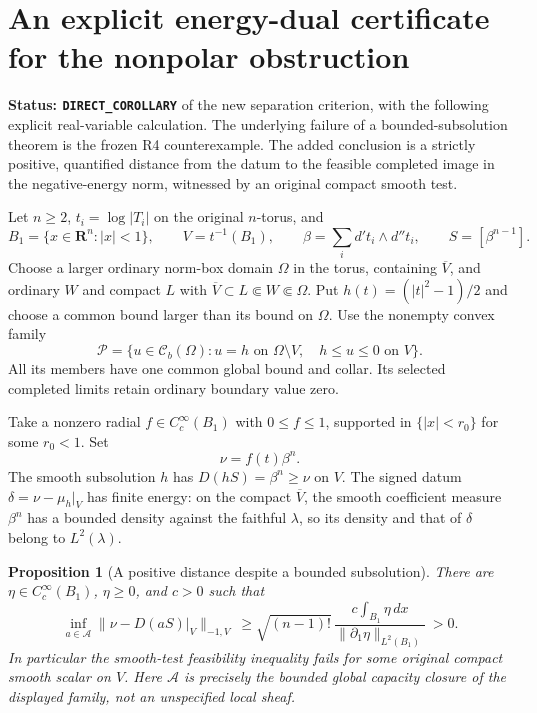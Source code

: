 \documentclass[11pt,a4paper]{article}
\numberwithin{equation}{section}
\newtheorem{proposition}[theorem]{Proposition}
\theoremstyle{definition}
\theoremstyle{remark}
\begin{document}


\section{An explicit energy-dual certificate for the nonpolar obstruction}
\label{sec:r6-toric-energy-certificate}

\noindent\textbf{Status: \texttt{DIRECT\_COROLLARY}} of the new
separation criterion, with the following explicit real-variable
calculation. The underlying failure of a bounded-subsolution theorem is
the frozen R4 counterexample. The added conclusion is a strictly positive,
quantified distance from the datum to the feasible completed image in the
negative-energy norm, witnessed by an original compact smooth test.

Let $n\ge2$, $t_i=\log|T_i|$ on the original $n$-torus, and
\[
 B_1=\{x\in\mathbf R^n:|x|<1\},\qquad V=t^{-1}(B_1),\qquad
 \beta=\sum_i d't_i\wedge d''t_i,\qquad S=[\beta^{n-1}].
\]
Choose a larger ordinary norm-box domain $\Omega$ in the torus,
containing $\overline V$, and ordinary $W$ and compact $L$ with
$\overline V\subset L\Subset W\Subset\Omega$.
Put $h(t)=(|t|^2-1)/2$ and choose a common bound larger than its bound
on $\Omega$. Use the nonempty convex family
\[
 \mathscr P=\{u\in\mathcal C_b(\Omega):
       u=h\text{ on }\Omega\setminus V,\quad h\le u\le0\text{ on }V\}.
\]
All its members have one common global bound and collar. Its selected
completed limits retain ordinary boundary value zero.

Take a nonzero radial $f\in C_c^\infty(B_1)$ with $0\le f\le1$,
supported in $\{|x|<r_0\}$ for some $r_0<1$. Set
\[
                     \nu=f(t)\beta^n.
\]
The smooth subsolution $h$ has $D(hS)=\beta^n\ge\nu$ on $V$.
The signed datum $\delta=\nu-\mu_h|_V$ has finite energy: on the
compact $\overline V$, the smooth coefficient measure $\beta^n$ has a
bounded density against the faithful $\lambda$, so its density and that
of $\delta$ belong to $L^2(\lambda)$.

\begin{proposition}[A positive distance despite a bounded subsolution]
\label{prop:r6-toric-positive-separation-distance}
There are $\eta\in C_c^\infty(B_1)$, $\eta\ge0$, and $c>0$ such that
\begin{equation}
 \inf_{a\in\mathscr A}
       \|\nu-D(aS)|_V\|_{-1,V}
 \ \ge\sqrt{(n-1)!}\,
              \frac{c\int_{B_1}\eta\,dx}{\|\partial_1\eta\|_{L^2(B_1)}}
 \ >0.
 \label{eq:r6-toric-distance-lower-bound}
\end{equation}
In particular the smooth-test feasibility inequality fails for some
original compact smooth scalar on $V$. Here $\mathscr A$ is precisely the
bounded global capacity closure of the displayed family, not an
unspecified local sheaf.
\end{proposition}
\end{document}
